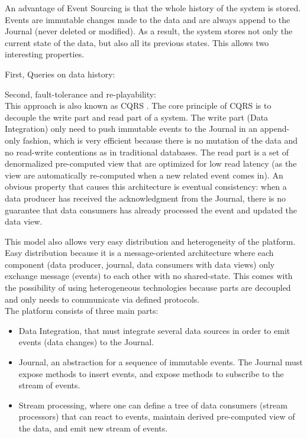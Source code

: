An advantage of Event Sourcing is that the whole history of the system is stored. Events are immutable changes made to the data
and are always append to the Journal (never deleted or modified). As a result, the system stores not only the current state
of the data, but also all its previous states. This allows two interesting properties.

First, Queries on data history:

Second, fault-tolerance and re-playability:
\\ 

This approach is also known as CQRS . The core principle of CQRS is to decouple the write part and read part
of a system. The write part (Data Integration) only need to push immutable events to the Journal in an append-only fashion, which
is very efficient because there is no mutation of the data and no read-write contentions as in traditional databases.
The read part is a set of denormalized pre-computed view that are optimized for low read latency (as the view are automatically re-computed
when a new related event comes in). 
An obvious property that causes this architecture is eventual consistency: when a data producer has received the acknowledgment
from the Journal, there is no guarantee that data consumers has already processed the event and updated the data view.

This model also allows very easy distribution and heterogeneity of the platform. Easy distribution because it is a message-oriented
architecture where each component (data producer, journal, data consumers with data views) only exchange message (events) to each other with
no shared-state. This comes with the possibility of using heterogeneous technologies because parts are decoupled and only needs
to communicate via defined protocols.
\\



The platform consists of three main parts: 
\begin{itemize}
  \item Data Integration, that must integrate several data sources in order to emit 
events (data changes) to the Journal. 
  \item Journal, an abstraction for a sequence of immutable events. The Journal must expose methods to insert events,
  and expose methods to subscribe to the stream of events.
  \item Stream processing, where one can define a tree of data consumers (stream processors) that can react to
  events, maintain derived pre-computed view of the data, and emit new stream of events.
\end{itemize}

